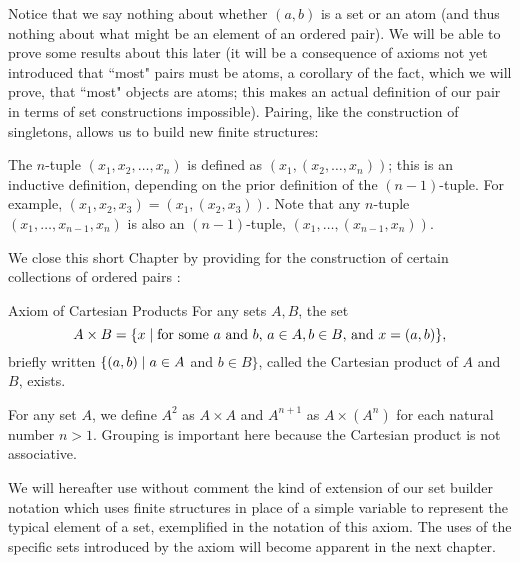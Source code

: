 Notice that we say nothing about whether $(a,b)$ is a set or
an atom (and thus nothing about what might be an element of an ordered
pair).  We will be able to prove some results about this later (it
will be a consequence of axioms not yet introduced that ``most" pairs
must be atoms, a corollary of the fact, which we will prove, that
``most" objects are atoms; this makes an actual definition of our pair
in terms of set constructions impossible).  Pairing, like the
construction of singletons, allows us to build new
finite structures:

\begin{definition}
 The {\upshape $n$-tuple $(x_1,x_2,\ldots,x_n)$} is defined as
 $(x_1,(x_2,\ldots,x_n))$;
 this is an inductive definition, depending on the prior definition of
 the $(n-1)$-tuple.  For example, $(x_1,x_2,x_3) = (x_1,(x_2,x_3))$.  Note that
 any $n$-tuple $(x_1,\ldots,x_{n-1},x_n)$ is also an $(n-1)$-tuple,
 $(x_1,\ldots,(x_{n-1},x_n))$.
\end{definition}


We close this short Chapter by providing for the construction
of certain collections of ordered pairs
:

\begin{axiom}{Axiom of Cartesian Products}
 For any sets $A,B$, the set
 $$
  A \times B = \{x \mid
  \mbox{for some $a$ and $b$, $ a \in A, b \in B,$ and $x = (a,b)$}\},
 $$
 briefly written 
 $\{(a,b) \mid a \in A$ and $b \in B\}$, called the {\upshape Cartesian
 product\/} of $A$ and $B$, exists.
\end{axiom}

\begin{definition}
  For any set $A$, we define $A^2$ as $A\times A$ and $A^{n+1}$ as $A \times
  (A^{n})$ for each natural number $n>1$.  Grouping is
  important here because the Cartesian product is not
  associative.
\end{definition}

We will hereafter use without comment the kind of extension of
our set builder notation which uses finite structures
in place of a simple variable to represent the typical element of a set,
exemplified in the notation of this axiom.  The uses of the specific sets
introduced by the axiom will become apparent in the next chapter.

